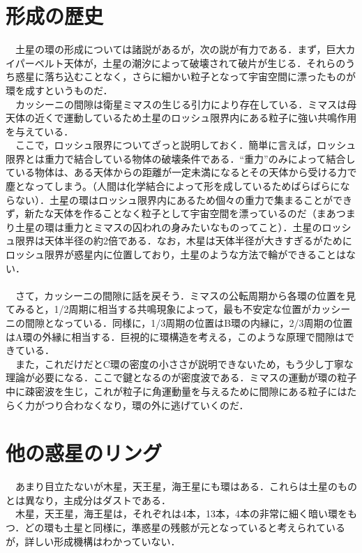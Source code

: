 \documentclass[../main]{subfiles}
\begin{document}
\section{形成の歴史}
　土星の環の形成については諸説があるが，次の説が有力である．まず，巨大カイパーベルト天体が，土星の潮汐によって破壊されて破片が生じる．それらのうち惑星に落ち込むことなく，さらに細かい粒子となって宇宙空間に漂ったものが環を成すというものだ．\\
　カッシーニの間隙は衛星ミマスの生じる引力により存在している．ミマスは母天体の近くで運動しているため土星のロッシュ限界内にある粒子に強い共鳴作用を与えている．\\
　ここで，ロッシュ限界についてざっと説明しておく．簡単に言えば，ロッシュ限界とは重力で結合している物体の破壊条件である．``重力''のみによって結合している物体は、ある天体からの距離が一定未満になるとその天体から受ける力で塵となってしまう。（人間は化学結合によって形を成しているためばらばらにならない）．土星の環はロッシュ限界内にあるため個々の重力で集まることができず，新たな天体を作ることなく粒子として宇宙空間を漂っているのだ（まあつまり土星の環は重力とミマスの囚われの身みたいなものってこと）．土星のロッシュ限界は天体半径の約2倍である．なお，木星は天体半径が大きすぎるがためにロッシュ限界が惑星内に位置しており，土星のような方法で輪ができることはない．
\\\\
　さて，カッシーニの間隙に話を戻そう．ミマスの公転周期から各環の位置を見てみると，1/2周期に相当する共鳴現象によって，最も不安定な位置がカッシーニの間隙となっている．同様に，1/3周期の位置はB環の内縁に，2/3周期の位置はA環の外縁に相当する．巨視的に環構造を考える，このような原理で間隙はできている．\\
　また，これだけだとC環の密度の小ささが説明できないため，もう少し丁寧な理論が必要になる．ここで鍵となるのが密度波である．ミマスの運動が環の粒子中に疎密波を生じ，これが粒子に角運動量を与えるために間隙にある粒子にはたらく力がつり合わなくなり，環の外に逃げていくのだ．


\section{他の惑星のリング}
　あまり目立たないが木星，天王星，海王星にも環はある．これらは土星のものとは異なり，主成分はダストである．\\
　木星，天王星，海王星は，それぞれは4本，13本，4本の非常に細く暗い環をもつ．どの環も土星と同様に，準惑星の残骸が元となっていると考えられているが，詳しい形成機構はわかっていない．
\end{document}
